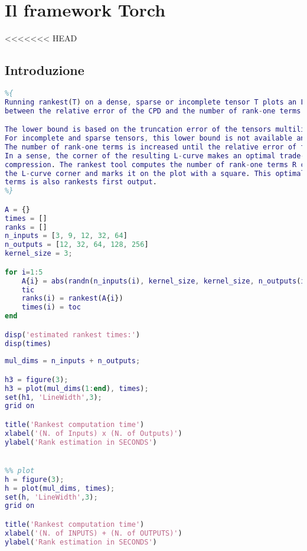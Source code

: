
\chapter{Il framework Torch} %
\label{AppendixB} %
<<<<<<< HEAD
\def \path {Appendices/}
\section{Introduzione}


\begin{lstlisting}[language={Matlab}]
%% Rankest performance evaluation 
%{
Running rankest(T) on a dense, sparse or incomplete tensor T plots an L-curve which represents the balance
between the relative error of the CPD and the number of rank-one terms R. 

The lower bound is based on the truncation error of the tensors multilinear singular values 
For incomplete and sparse tensors, this lower bound is not available and the first value to be tried for R is 1. 
The number of rank-one terms is increased until the relative error of the approximation is less than options.MinRelErr. 
In a sense, the corner of the resulting L-curve makes an optimal trade-off between accuracy and
compression. The rankest tool computes the number of rank-one terms R corresponding to
the L-curve corner and marks it on the plot with a square. This optimal number of rank-one
terms is also rankests first output.
%}

A = {}
times = []
ranks = []
n_inputs = [3, 9, 12, 32, 64]
n_outputs = [12, 32, 64, 128, 256]
kernel_size = 3; 

for i=1:5
    A{i} = abs(randn(n_inputs(i), kernel_size, kernel_size, n_outputs(i)))
    tic
    ranks(i) = rankest(A{i})
    times(i) = toc
end 

disp('estimated rankest times:') 
disp(times)
 
mul_dims = n_inputs + n_outputs; 

h3 = figure(3);
h3 = plot(mul_dims(1:end), times);
set(h1, 'LineWidth',3);
grid on

title('Rankest computation time') 
xlabel('(N. of Inputs) x (N. of Outputs)') 
ylabel('Rank estimation in SECONDS') 


%% plot
h = figure(3);
h = plot(mul_dims, times);
set(h, 'LineWidth',3);
grid on

title('Rankest computation time') 
xlabel('(N. of INPUTS) + (N. of OUTPUTS)') 
ylabel('Rank estimation in SECONDS') 

\end{lstlisting}

